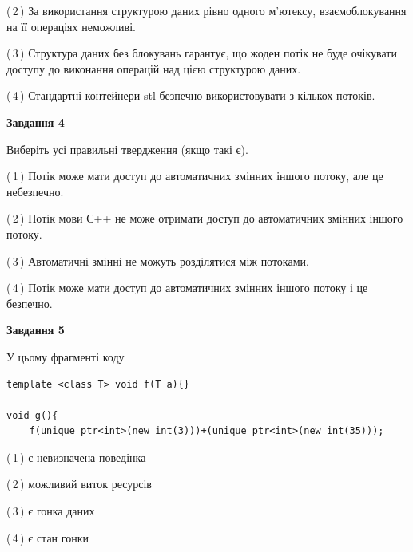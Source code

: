 \documentclass[12pt, ukrainian]{article}
\begin{document}
\begin {large}
{(\,2\,) За використання структурою даних рівно одного м’ютексу, взаємоблокування на її операціях неможливі.%

(\,3\,) Структура даних без блокувань гарантує, що жоден потік не буде очікувати доступу до виконання операцій над цією структурою даних.%

(\,4\,) Стандартні контейнери stl безпечно використовувати з кількох потоків.%



\begin{center}
\textbf{Завдання 4}
\end{center}
Виберіть усі правильні твердження (якщо такі є).\par
\vspace{2mm}

(\,1\,) Потік може мати доступ до автоматичних змінних іншого потоку, але це небезпечно.%

(\,2\,) Потік мови С++ не може отримати доступ до автоматичних змінних іншого потоку.%

(\,3\,) Автоматичні змінні не можуть розділятися між потоками.%

(\,4\,) Потік може мати доступ до автоматичних змінних іншого потоку і це безпечно.%



\begin{center}
\textbf{Завдання 5}
\end{center}
У цьому фрагменті коду
\begin{verbatim}
template <class T> void f(T a){}

void g(){
    f(unique_ptr<int>(new int(3)))+(unique_ptr<int>(new int(35)));
\end{verbatim}

(\,1\,) є невизначена поведінка%

(\,2\,) можливий виток ресурсів%

(\,3\,) є гонка даних%

(\,4\,) є стан гонки%


}
\end {large}
\end{document}
